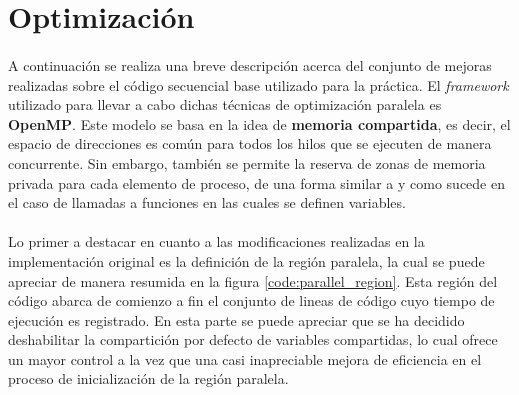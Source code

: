 \documentclass[10pt, a4paper,spanish]{article}
\begin{document}
		\paragraph{}
		\cite{subject:cp}

		\paragraph{}
		\cite{subject:cp}

	\section{Optimización}

		\paragraph{}
		A continuación se realiza una breve descripción acerca del conjunto de mejoras realizadas sobre el código secuencial base utilizado para la práctica. El \emph{framework} utilizado para llevar a cabo dichas técnicas de optimización paralela es \textbf{OpenMP}\cite{tool:openmp}. Este modelo se basa en la idea de \textbf{memoria compartida}, es decir, el espacio de direcciones es común para todos los hilos que se ejecuten de manera concurrente. Sin embargo, también se permite la reserva de zonas de memoria privada para cada elemento de proceso, de una forma similar a y como sucede en el caso de llamadas a funciones en las cuales se definen variables.


		\paragraph{}
		Lo primer a destacar en cuanto a las modificaciones realizadas en la implementación original es la definición de la región paralela, la cual se puede apreciar de manera resumida en la figura \ref{code:parallel_region}. Esta región del código abarca de comienzo a fin el conjunto de lineas de código cuyo tiempo de ejecución es registrado. En esta parte se puede apreciar que se ha decidido deshabilitar la compartición por defecto de variables compartidas, lo cual ofrece un mayor control a la vez que una casi inapreciable mejora de eficiencia en el proceso de inicialización de la región paralela.
\end{document}
